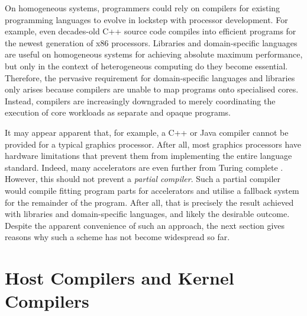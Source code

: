     On homogeneous systems, programmers could rely on compilers for existing
    programming languages to evolve in lockstep with processor development.
    For example, even decades-old C++ source code compiles into efficient
    programs for the newest generation of x86 processors.
    Libraries and domain-specific languages are useful on homogeneous systems
    for achieving absolute maximum performance, but only in the context of
    heterogeneous computing do they become essential.
    Therefore, the pervasive requirement for domain-specific languages and
    libraries only arises because compilers are unable to map programs onto
    specialised cores.
    Instead, compilers are increasingly downgraded to merely coordinating the
    execution of core workloads as separate and opaque programs.

    It may appear apparent that, for example, a C++ or Java compiler cannot
    be provided for a typical graphics processor.
    After all, most graphics processors have hardware limitations that prevent
    them from implementing the entire language standard.
    Indeed, many accelerators are even further from Turing complete
    \citep{jouppi2017datacenter}.
    However, this should not prevent a {\it partial compiler}.
    Such a partial compiler would compile fitting program parts for accelerators
    and utilise a fallback system for the remainder of the program.
    After all, that is precisely the result achieved with libraries and
    domain-specific languages, and likely the desirable outcome.
    Despite the apparent convenience of such an approach, the next section gives
    reasons why such a scheme has not become widespread so far.

\section{Host Compilers and Kernel Compilers}
\label{sec:hostkernel}

